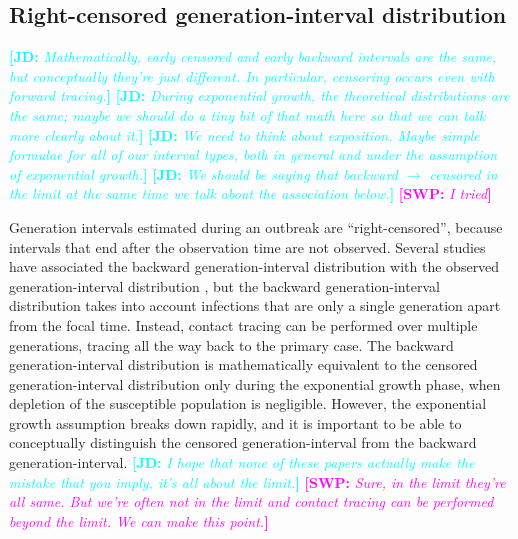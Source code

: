 \documentclass[12pt]{article}
\newcommand{\comment}[3]{\textcolor{#1}{\textbf{[#2: }\textsl{#3}\textbf{]}}}
\newcommand{\jd}[1]{\comment{cyan}{JD}{#1}}
\newcommand{\swp}[1]{\comment{magenta}{SWP}{#1}}
\begin{document}
\subsection{Right-censored generation-interval distribution}

\jd{Mathematically, early censored and early backward intervals are the same, but conceptually they're just different. In particular, censoring occurs even with forward tracing.}
\jd{During exponential growth, the theoretical distributions are the same; maybe we should do a tiny bit of that math here so that we can talk more clearly about it.}
\jd{We need to think about exposition. Maybe simple formulae for all of our interval types, both in general and under the assumption of exponential growth.}
\jd{We should be saying that backward $\to$ censored in the limit at the same time we talk about the association below.}
\swp{I tried}

Generation intervals estimated during an outbreak are ``right-censored'', because intervals that end after the observation time are not observed. 
Several studies have associated the backward generation-interval distribution with the observed generation-interval distribution \citep{tomba2010some, nishiura2010time, champredon2015intrinsic, britton2019estimation}, but the backward generation-interval distribution takes into account infections that are only a single generation apart from the focal time.
Instead, contact tracing can be performed over multiple generations, tracing all the way back to the primary case.
The backward generation-interval distribution is mathematically equivalent to the censored generation-interval distribution only during the exponential growth phase, when depletion of the susceptible population is negligible.
However, the exponential growth assumption breaks down rapidly, and it is important to be able to conceptually distinguish the censored generation-interval from the backward generation-interval.
\jd{I hope that none of these papers actually make the mistake that you imply, it's all about the limit.}
\swp{Sure, in the limit they're all same. But we're often not in the limit and contact tracing can be performed beyond the limit. We can make this point.}
\end{document}
